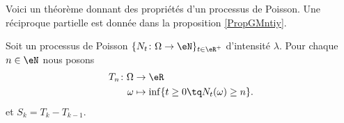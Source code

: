 Voici un théorème donnant des propriétés d'un processus de Poisson. Une réciproque partielle est donnée dans la proposition \ref{PropGMntiy}.
\begin{theorem}     \label{THOooYRIMooSREVEO}
	Soit un processus de Poisson \(  \{ N_t\colon \Omega\to \eN \}_{t\in \eR^+}  \) d'intensité \( \lambda\). Pour chaque \( n\in \eN\) nous posons
	\begin{equation}
		\begin{aligned}
			T_n\colon \Omega & \to \eR                                         \\
			\omega           & \mapsto \inf\{ t\geq 0\tq N_t(\omega)\geq n \}.
		\end{aligned}
	\end{equation}
	et \( S_k=T_k-T_{k-1}\).



\end{theorem}
